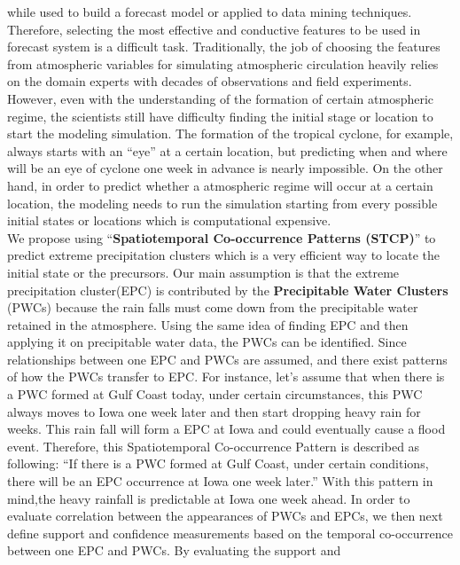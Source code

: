 \documentclass{acm_proc_article-sp}
\begin{document}
while used to build a forecast model or applied to data mining techniques.
Therefore, selecting the most effective and conductive features to be used in
forecast system is a difficult task. Traditionally, the job of choosing the
features from atmospheric variables for simulating atmospheric circulation
heavily relies on the domain experts with decades of observations and field
experiments.\cite{lubchenco2012extreme}
However, even with the understanding of the formation of certain atmospheric
regime, the scientists still have difficulty finding the initial stage or location
to start the modeling simulation. The formation of the tropical
cyclone, for example, always starts with an ``eye'' at a certain location, but predicting when and where will be an eye of cyclone one week in advance is nearly impossible. On the other hand, in order to predict whether a atmospheric regime will occur at a certain location, the modeling needs to run the simulation starting from every possible initial states or locations which is computational expensive. \cite{stensrud2000using} 
\\We propose using ``\textbf{Spatiotemporal Co-occurrence Patterns (STCP)}'' to predict extreme precipitation clusters which is a very efficient way to locate the initial state or the precursors. Our main assumption is that the extreme precipitation cluster(EPC) is contributed by the \textbf{Precipitable Water Clusters} (PWCs) because the rain falls must come down from the precipitable water retained in the atmosphere. Using the same idea of finding EPC and then applying it on precipitable water data, the PWCs can be identified. Since relationships between one EPC and PWCs are assumed, and there exist patterns of how the PWCs transfer to EPC.  For instance, let's assume that when there is a PWC formed at Gulf Coast today, under certain circumstances, this PWC always moves to Iowa one week later and then start dropping heavy rain for weeks. This rain fall will form a EPC at Iowa and could eventually cause a flood event. Therefore, this Spatiotemporal Co-occurrence Pattern is described as following: ``If there is a PWC formed at Gulf Coast, under certain conditions, there will be an EPC occurrence at Iowa one week later.'' With this pattern in mind,the heavy rainfall is predictable at Iowa one week ahead.
\newline In order to evaluate correlation between the appearances of PWCs and
EPCs, we then next define support and confidence measurements based on the
temporal co-occurrence between one EPC and PWCs. By evaluating the support and
\end{document}
